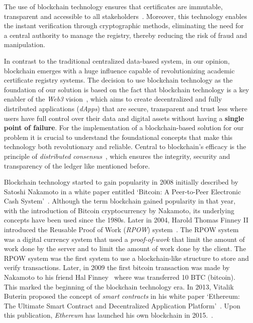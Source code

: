 The use of blockchain technology ensures that certificates are immutable, transparent and accessible to all stakeholders~\cite{alammary2019blockchain}. Moreover, this technology enables the instant verification through cryptographic methods,
eliminating the need for a central authority to manage the registry, thereby reducing the risk of fraud and manipulation.

In contrast to the traditional centralized data-based system, in our opinion, blockchain emerges with a huge influence capable of revolutionizing academic certificate registry systems.
The decision to use blockchain technology as the foundation of our solution is based on the fact that blockchain technology is a key enabler of the \textit{Web3} vision~\cite{buldas2022towards},
which aims to create decentralized and fully distributed applications (\textit{dApps}) that are secure, transparent and trust less where users have full control over their data and digital assets without having a \textbf{single point of failure}.
For the implementation of a blockchain-based solution for our problem it is crucial to understand the foundational concepts that make this technology both revolutionary and reliable.
Central to blockchain's efficacy is the principle of \textit{distributed consensus}~\cite{xiao2020survey}, which ensures the integrity, security and transparency of the ledger like mentioned before.


Blockchain technology started to gain popularity in 2008 initially described by Satoshi Nakamoto in a white paper entitled `Bitcoin: A Peer-to-Peer Electronic Cash System'~\cite{nakamoto2008bitcoin}.
Although the term blockchain gained popularity in that year, with the introduction of Bitcoin cryptocurrency by Nakamoto, its underlying concepts have been used since the 1980s.
Later in 2004, Harold Thomas Finney II introduced the Reusable Proof of Work (\textit{RPOW}) system~\cite{RPOW}. The RPOW system was a digital
currency system that used a \textit{proof-of-work} that limit the amount of work done by the server and to limit the amount of work done by the client.
The RPOW system was the first system to use a blockchain-like structure to store and verify transactions. Later, in 2009 the first bitcoin transaction was made by Nakamoto
to his friend Hal Finney~\cite{peterson2014hal} where was transferred 10 BTC (bitcoin). This marked the beginning of the blockchain technology era.
In 2013, Vitalik Buterin proposed the concept of \textit{smart contracts} in his white paper `Ethereum: The Ultimate Smart Contract and Decentralized Application Platform'~\cite{buterin2013ethereum}. Upon this publication,
\textit{Ethereum} has launched his own blockchain in 2015.~\cite{reiff2020bitcoin}.

